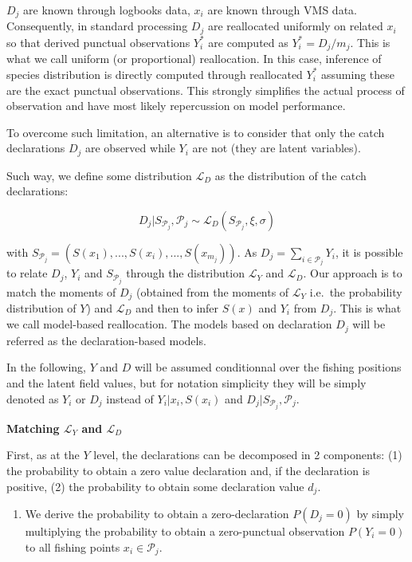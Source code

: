 \documentclass[
  english,
  man]{apa6}
\providecommand{\tightlist}{%
  \setlength{\itemsep}{0pt}\setlength{\parskip}{0pt}}
\begin{document}
\(D_j\) are known through logbooks data, \(x_i\) are known through VMS data. Consequently, in standard processing \(D_j\) are reallocated uniformly on related \(x_i\) so that derived punctual observations \(Y^*_i\) are computed as \(Y^*_i=D_j/m_j\). This is what we call uniform (or proportional) reallocation. In this case, inference of species distribution is directly computed through reallocated \(Y^*_i\) assuming these are the exact punctual observations. This strongly simplifies the actual process of observation and have most likely repercussion on model performance.

To overcome such limitation, an alternative is to consider that only the catch declarations \(D_j\) are observed while \(Y_i\) are not (they are latent variables).

Such way, we define some distribution \(\mathcal{L}_D\) as the distribution of the catch declarations:

\[D_j | S_{\mathcal{P}_j},\mathcal{P}_j \sim \mathcal{L}_D( S_{\mathcal{P}_j},\xi,\sigma)\]

with \(S_{\mathcal{P}_j}=(S(x_1),...,S(x_i), ...,S(x_{m_j}))\). As \(D_j=\sum_{i \in \mathcal{P}_j}{Y_{i}}\), it is possible to relate \(D_j\), \(Y_i\) and \(S_{\mathcal{P}_j}\) through the distribution \(\mathcal{L}_Y\) and \(\mathcal{L}_D\). Our approach is to match the moments of \(D_j\) (obtained from the moments of \(\mathcal{L}_Y\) i.e.~the probability distribution of \(Y\)) and \(\mathcal{L}_D\) and then to infer \(S(x)\) and \(Y_i\) from \(D_j\). This is what we call model-based reallocation. The models based on declaration \(D_j\) will be referred as the declaration-based models.

In the following, \(Y\) and \(D\) will be assumed conditionnal over the fishing positions and the latent field values, but for notation simplicity they will be simply denoted as \(Y_i\) or \(D_j\) instead of \(Y_i \vert x_i, S(x_i)\) and \(D_j | S_{\mathcal{P}_j},\mathcal{P}_j\).

\textbf{Matching \(\mathcal{L}_Y\) and \(\mathcal{L}_D\)}

First, as at the \(Y\) level, the declarations can be decomposed in 2 components: (1) the probability to obtain a zero value declaration and, if the declaration is positive, (2) the probability to obtain some declaration value \(d_j\).

\begin{enumerate}
\def\labelenumi{(\arabic{enumi})}
\tightlist
\item
  We derive the probability to obtain a zero-declaration \(P(D_j = 0)\) by simply multiplying the probability to obtain a zero-punctual observation \(P(Y_i=0 )\) to all fishing points \(x_i \in \mathcal{P}_j\).
\end{enumerate}
\end{document}
